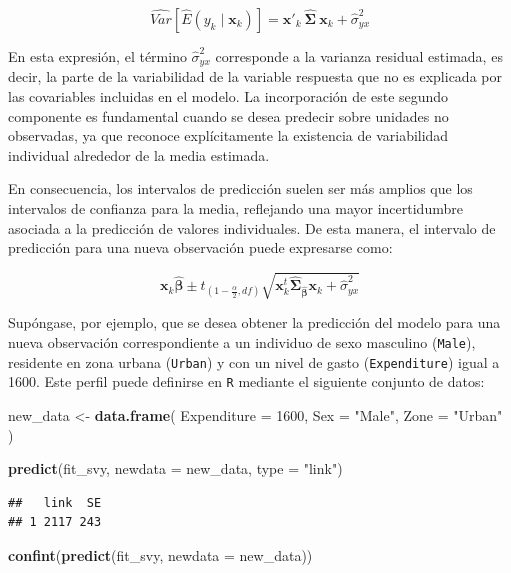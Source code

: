 \documentclass[
  spanish,
  12pt,
]{book}
\newenvironment{Shaded}{\begin{snugshade}}{\end{snugshade}}
\newcommand{\AttributeTok}[1]{\textcolor[rgb]{0.13,0.29,0.53}{#1}}
\newcommand{\DecValTok}[1]{\textcolor[rgb]{0.00,0.00,0.81}{#1}}
\newcommand{\FunctionTok}[1]{\textcolor[rgb]{0.13,0.29,0.53}{\textbf{#1}}}
\newcommand{\NormalTok}[1]{#1}
\newcommand{\OtherTok}[1]{\textcolor[rgb]{0.56,0.35,0.01}{#1}}
\newcommand{\StringTok}[1]{\textcolor[rgb]{0.31,0.60,0.02}{#1}}
\begin{document}
\[
\widehat{Var}\left[\hat{E}\left(y_{k}\mid\mathbf{x}_{k}\right)\right]
=
\mathbf{x}'_{k} \
\hat{\boldsymbol{\Sigma}} \
\mathbf{x}_{k}
+
\hat{\sigma}^2_{yx}
\]

En esta expresión, el término \(\hat{\sigma}^2_{yx}\) corresponde a la varianza residual estimada, es decir, la parte de la variabilidad de la variable respuesta que no es explicada por las covariables incluidas en el modelo. La incorporación de este segundo componente es fundamental cuando se desea predecir sobre unidades no observadas, ya que reconoce explícitamente la existencia de variabilidad individual alrededor de la media estimada.

En consecuencia, los intervalos de predicción suelen ser más amplios que los intervalos de confianza para la media, reflejando una mayor incertidumbre asociada a la predicción de valores individuales. De esta manera, el intervalo de predicción para una nueva observación puede expresarse como:

\[
\mathbf{x}_{k}\hat{\boldsymbol{\beta}}
\pm
t_{\left(1-\frac{\alpha}{2},df\right)}
\sqrt{
\mathbf{x}_{k}^{t}
\hat{\boldsymbol{\Sigma}}_{\hat{\boldsymbol{\beta}}}
\mathbf{x}_{k}
+
\hat{\sigma}^2_{yx}
}
\]

Supóngase, por ejemplo, que se desea obtener la predicción del modelo para una nueva observación correspondiente a un individuo de sexo masculino (\texttt{Male}), residente en zona urbana (\texttt{Urban}) y con un nivel de gasto (\texttt{Expenditure}) igual a 1600. Este perfil puede definirse en \texttt{R} mediante el siguiente conjunto de datos:

\begin{Shaded}
\begin{Highlighting}[]
\NormalTok{new\_data }\OtherTok{\textless{}{-}} \FunctionTok{data.frame}\NormalTok{(}
  \AttributeTok{Expenditure =} \DecValTok{1600}\NormalTok{,}
  \AttributeTok{Sex =} \StringTok{"Male"}\NormalTok{,}
  \AttributeTok{Zone =} \StringTok{"Urban"}
\NormalTok{)}

\FunctionTok{predict}\NormalTok{(fit\_svy, }\AttributeTok{newdata =}\NormalTok{ new\_data, }\AttributeTok{type =} \StringTok{"link"}\NormalTok{)}
\end{Highlighting}
\end{Shaded}

\begin{verbatim}
##   link  SE
## 1 2117 243
\end{verbatim}

\begin{Shaded}
\begin{Highlighting}[]
\FunctionTok{confint}\NormalTok{(}\FunctionTok{predict}\NormalTok{(fit\_svy, }\AttributeTok{newdata =}\NormalTok{ new\_data))}
\end{Highlighting}
\end{Shaded}
\end{document}
